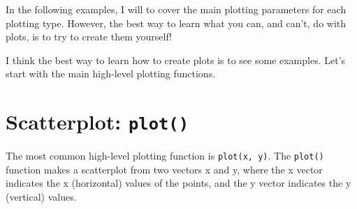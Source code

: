 \documentclass[]{book}
\theoremstyle{definition}
\theoremstyle{definition}
\theoremstyle{remark}
\begin{document}
In the following examples, I will to cover the main plotting parameters
for each plotting type. However, the best way to learn what you can, and
can't, do with plots, is to try to create them yourself!

I think the best way to learn how to create plots is to see some
examples. Let's start with the main high-level plotting functions.

\section{\texorpdfstring{Scatterplot:
\texttt{plot()}}{Scatterplot: plot()}}\label{scatterplot-plot}

The most common high-level plotting function is \texttt{plot(x,\ y)}.
The \texttt{plot()} function makes a scatterplot from two vectors x and
y, where the x vector indicates the x (horizontal) values of the points,
and the y vector indicates the y (vertical) values.
\end{document}
